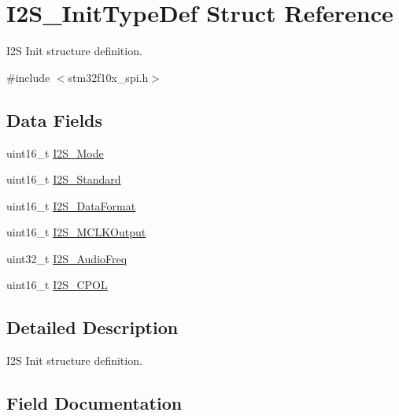 \hypertarget{struct_i2_s___init_type_def}{}\section{I2\+S\+\_\+\+Init\+Type\+Def Struct Reference}
\label{struct_i2_s___init_type_def}


I2S Init structure definition.  




{\ttfamily \#include $<$stm32f10x\+\_\+spi.\+h$>$}

\subsection*{Data Fields}
\begin{DoxyCompactItemize}
\item 
uint16\+\_\+t \mbox{\hyperlink{struct_i2_s___init_type_def_ab239a97360862b2514410fef774686f5}{I2\+S\+\_\+\+Mode}}
\item 
uint16\+\_\+t \mbox{\hyperlink{struct_i2_s___init_type_def_a0f0c02142c68e2c2f0038ca79bdbd365}{I2\+S\+\_\+\+Standard}}
\item 
uint16\+\_\+t \mbox{\hyperlink{struct_i2_s___init_type_def_a5d36bbd1f2aa29414ae1d25c3cc0d66c}{I2\+S\+\_\+\+Data\+Format}}
\item 
uint16\+\_\+t \mbox{\hyperlink{struct_i2_s___init_type_def_a4e49b94b867428b8abf8e5385fb0879d}{I2\+S\+\_\+\+M\+C\+L\+K\+Output}}
\item 
uint32\+\_\+t \mbox{\hyperlink{struct_i2_s___init_type_def_aabe09351d033858f65fb27add7c50918}{I2\+S\+\_\+\+Audio\+Freq}}
\item 
uint16\+\_\+t \mbox{\hyperlink{struct_i2_s___init_type_def_a948d79d6388454da8459fea27c338900}{I2\+S\+\_\+\+C\+P\+OL}}
\end{DoxyCompactItemize}


\subsection{Detailed Description}
I2S Init structure definition. 



\subsection{Field Documentation}
\mbox{\label{struct_i2_s___init_type_def_aabe09351d033858f65fb27add7c50918}} 
